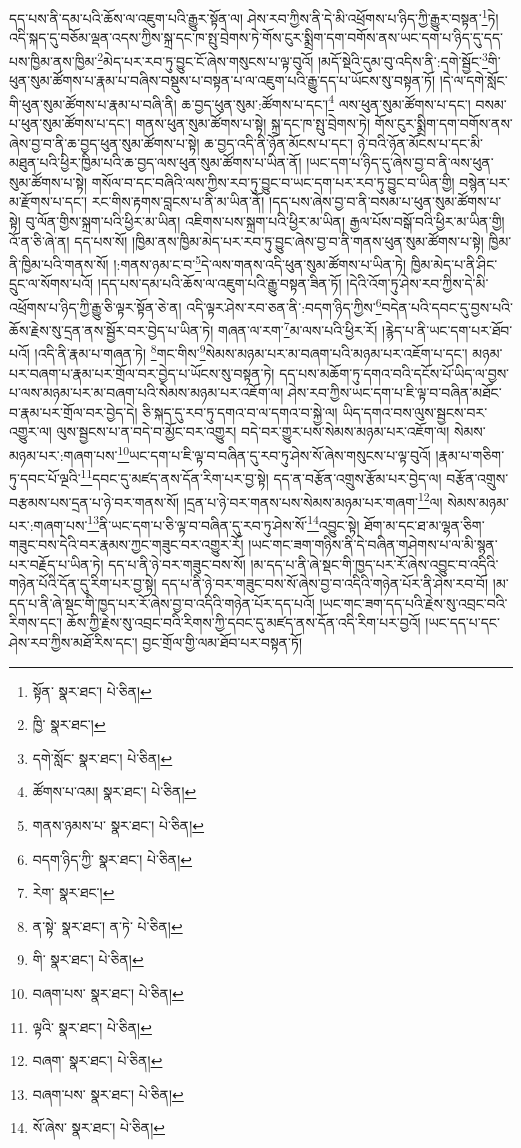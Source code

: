 དད་པས་ནི་དམ་པའི་ཆོས་ལ་འཇུག་པའི་རྒྱུར་སྟོན་ལ། ཤེས་རབ་ཀྱིས་ནི་དེ་མི་འཕྲོགས་པ་ཉིད་ཀྱི་རྒྱུར་བསྟན་\footnote{སྟོན་  སྣར་ཐང་།  པེ་ཅིན། }ཏེ། འདི་སྐད་དུ་བཅོམ་ལྡན་འདས་ཀྱིས་སྐྲ་དང་ཁ་སྤུ་བྲེགས་ཏེ་གོས་ངུར་སྨྲིག་དག་བགོས་ནས་ཡང་དག་པ་ཉིད་དུ་དད་པས་ཁྱིམ་ནས་ཁྱིམ་\footnote{ཁྱི་  སྣར་ཐང་། }མེད་པར་རབ་ཏུ་བྱུང་ངོ་ཞེས་གསུངས་པ་ལྟ་བུའོ། །མདོ་སྡེའི་དུམ་བུ་འདིས་ནི་:དགེ་སྦྱོང་\footnote{དགེ་སློང་  སྣར་ཐང་།  པེ་ཅིན། }གི་ཕུན་སུམ་ཚོགས་པ་རྣམ་པ་བཞིས་བསྡུས་པ་བསྟན་པ་ལ་འཇུག་པའི་རྒྱུ་དད་པ་ཡོངས་སུ་བསྟན་ཏོ། །དེ་ལ་དགེ་སློང་གི་ཕུན་སུམ་ཚོགས་པ་རྣམ་པ་བཞི་ནི། ཆ་བྱད་ཕུན་སུམ་:ཚོགས་པ་དང་།\footnote{ཚོགས་པ་འམ།  སྣར་ཐང་།  པེ་ཅིན། } ལས་ཕུན་སུམ་ཚོགས་པ་དང་། བསམ་པ་ཕུན་སུམ་ཚོགས་པ་དང་། གནས་ཕུན་སུམ་ཚོགས་པ་སྟེ། སྐྲ་དང་ཁ་སྤུ་བྲེགས་ཏེ། གོས་ངུར་སྨྲིག་དག་བགོས་ནས་ཞེས་བྱ་བ་ནི་ཆ་བྱད་ཕུན་སུམ་ཚོགས་པ་སྟེ། ཆ་བྱད་འདི་ནི་ཉོན་མོངས་པ་དང་། ཉེ་བའི་ཉོན་མོངས་པ་དང་མི་མཐུན་པའི་ཕྱིར་ཁྱིམ་པའི་ཆ་བྱད་ལས་ཕུན་སུམ་ཚོགས་པ་ཡིན་ནོ། །ཡང་དག་པ་ཉིད་དུ་ཞེས་བྱ་བ་ནི་ལས་ཕུན་སུམ་ཚོགས་པ་སྟེ། གསོལ་བ་དང་བཞིའི་ལས་ཀྱིས་རབ་ཏུ་བྱུང་བ་ཡང་དག་པར་རབ་ཏུ་བྱུང་བ་ཡིན་གྱི། བསྙེན་པར་མ་རྫོགས་པ་དང་། རང་གིས་རྟགས་བླངས་པ་ནི་མ་ཡིན་ནོ། །དད་པས་ཞེས་བྱ་བ་ནི་བསམ་པ་ཕུན་སུམ་ཚོགས་པ་སྟེ། བུ་ལོན་གྱིས་སྐྲག་པའི་ཕྱིར་མ་ཡིན། འཇིགས་པས་སྐྲག་པའི་ཕྱིར་མ་ཡིན། རྒྱལ་པོས་བསྒོ་བའི་ཕྱིར་མ་ཡིན་གྱི། འོ་ན་ཅི་ཞེ་ན། དད་པས་སོ། །ཁྱིམ་ནས་ཁྱིམ་མེད་པར་རབ་ཏུ་བྱུང་ཞེས་བྱ་བ་ནི་གནས་ཕུན་སུམ་ཚོགས་པ་སྟེ། ཁྱིམ་ནི་ཁྱིམ་པའི་གནས་སོ། །:གནས་ཉམ་ང་བ་\footnote{གནས་ཉམས་པ་  སྣར་ཐང་།  པེ་ཅིན། }དེ་ལས་གནས་འདི་ཕུན་སུམ་ཚོགས་པ་ཡིན་ཏེ། ཁྱིམ་མེད་པ་ནི་ཤིང་དྲུང་ལ་སོགས་པའོ། །དད་པས་དམ་པའི་ཆོས་ལ་འཇུག་པའི་རྒྱུ་བསྟན་ཟིན་ཏོ། །དེའི་འོག་ཏུ་ཤེས་རབ་ཀྱིས་དེ་མི་འཕྲོགས་པ་ཉིད་ཀྱི་རྒྱུ་ཅི་ལྟར་སྟོན་ཅེ་ན། འདི་ལྟར་ཤེས་རབ་ཅན་ནི་:བདག་ཉིད་ཀྱིས་\footnote{བདག་ཉིད་ཀྱི་  སྣར་ཐང་།  པེ་ཅིན། }བདེན་པའི་དབང་དུ་བྱས་པའི་ཆོས་རྗེས་སུ་དྲན་ནས་སྦྱོར་བར་བྱེད་པ་ཡིན་ཏེ། གཞན་ལ་རག་\footnote{རེག་  སྣར་ཐང་། }མ་ལས་པའི་ཕྱིར་རོ། །རྙེད་པ་ནི་ཡང་དག་པར་ཐོབ་པའོ། །འདི་ནི་རྣམ་པ་གཞན་ཏེ། \footnote{ན་སྟེ་  སྣར་ཐང་། ན་ཏེ་  པེ་ཅིན། }གང་གིས་\footnote{གི་  སྣར་ཐང་།  པེ་ཅིན། }སེམས་མཉམ་པར་མ་བཞག་པའི་མཉམ་པར་འཇོག་པ་དང་། མཉམ་པར་བཞག་པ་རྣམ་པར་གྲོལ་བར་བྱེད་པ་ཡོངས་སུ་བསྟན་ཏེ། དད་པས་མཆོག་ཏུ་དགའ་བའི་དངོས་པོ་ཡིད་ལ་བྱས་པ་ལས་མཉམ་པར་མ་བཞག་པའི་སེམས་མཉམ་པར་འཇོག་ལ། ཤེས་རབ་ཀྱིས་ཡང་དག་པ་ཇི་ལྟ་བ་བཞིན་མཐོང་བ་རྣམ་པར་གྲོལ་བར་བྱེད་དེ། ཅི་སྐད་དུ་རབ་ཏུ་དགའ་བ་ལ་དགའ་བ་སྐྱེ་ལ། ཡིད་དགའ་བས་ལུས་སྦྱངས་བར་འགྱུར་ལ། ལུས་སྦྱངས་པ་ན་བདེ་བ་མྱོང་བར་འགྱུར། བདེ་བར་གྱུར་པས་སེམས་མཉམ་པར་འཇོག་ལ། སེམས་མཉམ་པར་:གཞག་པས་\footnote{བཞག་པས་  སྣར་ཐང་།  པེ་ཅིན། }ཡང་དག་པ་ཇི་ལྟ་བ་བཞིན་དུ་རབ་ཏུ་ཤེས་སོ་ཞེས་གསུངས་པ་ལྟ་བུའོ། །རྣམ་པ་གཅིག་ཏུ་དབང་པོ་ལྔའི་\footnote{ལྟའི་  སྣར་ཐང་།  པེ་ཅིན། }དབང་དུ་མཛད་ནས་དོན་རིག་པར་བྱ་སྟེ། དད་ན་བརྩོན་འགྲུས་རྩོམ་པར་བྱེད་ལ། བརྩོན་འགྲུས་བརྩམས་པས་དྲན་པ་ཉེ་བར་གནས་སོ། །དྲན་པ་ཉེ་བར་གནས་པས་སེམས་མཉམ་པར་གཞག་\footnote{བཞག་  སྣར་ཐང་།  པེ་ཅིན། }ལ། སེམས་མཉམ་པར་:གཞག་པས་\footnote{བཞག་པས་  སྣར་ཐང་།  པེ་ཅིན། }ནི་ཡང་དག་པ་ཅི་ལྟ་བ་བཞིན་དུ་རབ་ཏུ་ཤེས་སོ་\footnote{སོ་ཞེས་  སྣར་ཐང་།  པེ་ཅིན། }འབྱུང་སྟེ། ཐོག་མ་དང་ཐ་མ་ལྷན་ཅིག་གཟུང་བས་དེའི་བར་རྣམས་ཀྱང་གཟུང་བར་འགྱུར་རོ། །ཡང་གང་ཟག་གཉིས་ནི་དེ་བཞིན་གཤེགས་པ་ལ་མི་སྙན་པར་བརྗོད་པ་ཡིན་ཏེ། དད་པ་ནི་ཉེ་བར་གཟུང་བས་སོ། །མ་དད་པ་ནི་ཞེ་སྡང་གི་ཁྱད་པར་རོ་ཞེས་འབྱུང་བ་འདིའི་གཉེན་པོའི་དོན་དུ་རིག་པར་བྱ་སྟེ། དད་པ་ནི་ཉེ་བར་གཟུང་བས་སོ་ཞེས་བྱ་བ་འདིའི་གཉེན་པོར་ནི་ཤེས་རབ་བོ། །མ་དད་པ་ནི་ཞེ་སྡང་གི་ཁྱད་པར་རོ་ཞེས་བྱ་བ་འདིའི་གཉེན་པོར་དད་པའོ། །ཡང་གང་ཟག་དད་པའི་རྗེས་སུ་འབྲང་བའི་རིགས་དང་། ཆོས་ཀྱི་རྗེས་སུ་འབྲང་བའི་རིགས་ཀྱི་དབང་དུ་མཛད་ནས་དོན་འདི་རིག་པར་བྱའོ། །ཡང་དད་པ་དང་ཤེས་རབ་ཀྱིས་མཐོ་རིས་དང་། བྱང་གྲོལ་གྱི་ལམ་ཐོབ་པར་བསྟན་ཏོ། 